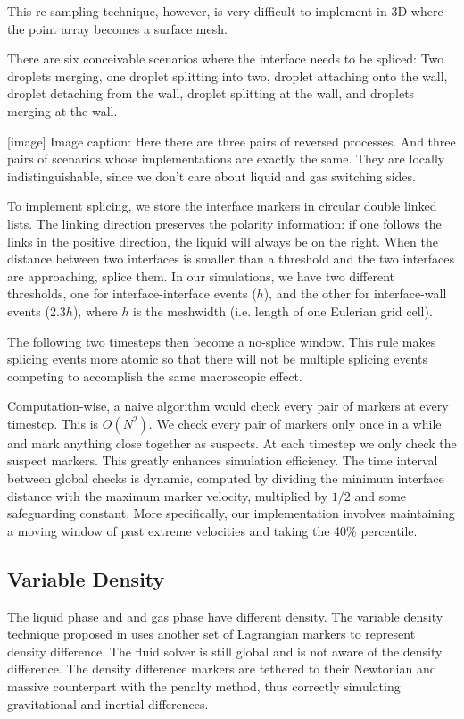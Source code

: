 \documentclass{jfm}
\begin{document}
This re-sampling technique, however, is very difficult to implement in 3D where the point array becomes a surface mesh.

There are six conceivable scenarios where the interface needs to be spliced: Two droplets merging, one droplet splitting into two, droplet attaching onto the wall, droplet detaching from the wall, droplet splitting at the wall, and droplets merging at the wall. 

[image]
Image caption: Here there are three pairs of reversed processes. And three pairs of scenarios whose implementations are exactly the same. They are locally indistinguishable, since we don't care about liquid and gas switching sides. 

To implement splicing, we store the interface markers in circular double linked lists. The linking direction preserves the polarity information: if one follows the links in the positive direction, the liquid will always be on the right. When the distance between two interfaces is smaller than a threshold and the two interfaces are approaching, splice them. In our simulations, we have two different thresholds, one for interface-interface events ($h$), and the other for interface-wall events ($2.3h$), where $h$ is the meshwidth (i.e. length of one Eulerian grid cell). 

The following two timesteps then become a no-splice window. This rule makes splicing events more atomic so that there will not be multiple splicing events competing to accomplish the same macroscopic effect. 

Computation-wise, a naive algorithm would check every pair of markers at every timestep. This is $O(N^2)$. We check every pair of markers only once in a while and mark anything close together as suspects. At each timestep we only check the suspect markers. This greatly enhances simulation efficiency. The time interval between global checks is dynamic, computed by dividing the minimum interface distance with the maximum marker velocity, multiplied by $1/2$ and some safeguarding constant. More specifically, our implementation involves maintaining a moving window of past extreme velocities and taking the 40\% percentile. 

\subsection{Variable Density}
The liquid phase and and gas phase have different density. The variable density technique proposed in \cite{IBM_variable_density} uses another set of Lagrangian markers to represent density difference. The fluid solver is still global and is not aware of the density difference. The density difference markers are tethered to their Newtonian and massive counterpart with the penalty method, thus correctly simulating gravitational and inertial differences.
\end{document}

